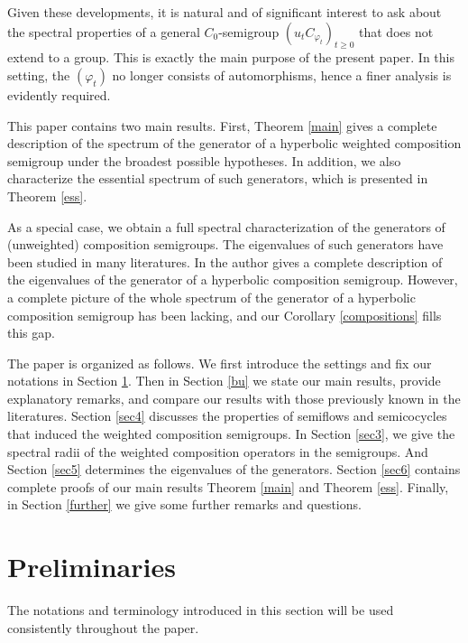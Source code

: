\documentclass{amsart}
\theoremstyle{proclaim}
\theoremstyle{fancyproclaim}
\theoremstyle{definition}
\theoremstyle{fancystatement}
\numberwithin{equation}{section}
\begin{document}
Given these developments, it is natural and of significant interest to ask about the spectral properties of a general $C_0$-semigroup $(u_tC_{\varphi_t})_{t\geq 0}$ that does not extend to a group. This is exactly the main purpose of the present paper. In this setting, the $(\varphi_t)$ no longer consists of automorphisms, hence a finer analysis is evidently required. 


This paper contains two main results. First, Theorem \ref{main} gives a complete description of the spectrum of the generator of a hyperbolic weighted composition semigroup under the broadest possible hypotheses. In addition, we also characterize the essential spectrum of such generators, which is presented in Theorem \ref{ess}.

As a special case, we obtain a full spectral characterization of the generators of (unweighted) composition semigroups. The eigenvalues of such generators have been studied in many literatures. In \cite{tezheng1, tezheng2} the author gives a complete description of the eigenvalues of the generator of a hyperbolic composition semigroup. However, a complete picture of the whole spectrum of the generator of a hyperbolic composition semigroup has been lacking, and our Corollary \ref{compositions} fills this gap. 

The paper is organized as follows. We first introduce the settings and fix our notations in Section \ref{sec2}.  Then in Section \ref{bu} we state our main results, provide explanatory remarks, and compare our results with those previously known in the literatures. Section \ref{sec4} discusses the properties of semiflows and semicocycles that induced the weighted composition semigroups. In Section \ref{sec3}, we give the spectral radii of the weighted composition operators in the semigroups. And Section \ref{sec5} determines the eigenvalues of the generators. Section \ref{sec6} contains complete proofs of our main results Theorem \ref{main} and Theorem \ref{ess}. Finally, in Section \ref{further} we give some further remarks and questions.







\section{Preliminaries}\label{sec2}

The notations and terminology introduced in this section will be used consistently throughout the paper.
\end{document}
